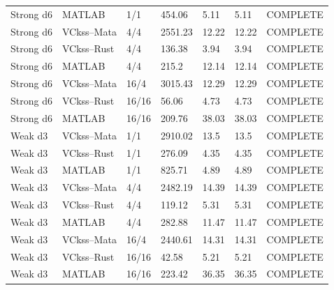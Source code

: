 \begin{longtable}{lllllll}
Strong d6 & MATLAB & 1/1 & 454.06 & 5.11 & 5.11 & COMPLETE \\
Strong d6 & VCkss--Mata & 4/4 & 2551.23 & 12.22 & 12.22 & COMPLETE \\
Strong d6 & VCkss--Rust & 4/4 & 136.38 & 3.94 & 3.94 & COMPLETE \\
Strong d6 & MATLAB & 4/4 & 215.2 & 12.14 & 12.14 & COMPLETE \\
Strong d6 & VCkss--Mata & 16/4 & 3015.43 & 12.29 & 12.29 & COMPLETE \\
Strong d6 & VCkss--Rust & 16/16 & 56.06 & 4.73 & 4.73 & COMPLETE \\
Strong d6 & MATLAB & 16/16 & 209.76 & 38.03 & 38.03 & COMPLETE \\
Weak d3 & VCkss--Mata & 1/1 & 2910.02 & 13.5 & 13.5 & COMPLETE \\
Weak d3 & VCkss--Rust & 1/1 & 276.09 & 4.35 & 4.35 & COMPLETE \\
Weak d3 & MATLAB & 1/1 & 825.71 & 4.89 & 4.89 & COMPLETE \\
Weak d3 & VCkss--Mata & 4/4 & 2482.19 & 14.39 & 14.39 & COMPLETE \\
Weak d3 & VCkss--Rust & 4/4 & 119.12 & 5.31 & 5.31 & COMPLETE \\
Weak d3 & MATLAB & 4/4 & 282.88 & 11.47 & 11.47 & COMPLETE \\
Weak d3 & VCkss--Mata & 16/4 & 2440.61 & 14.31 & 14.31 & COMPLETE \\
Weak d3 & VCkss--Rust & 16/16 & 42.58 & 5.21 & 5.21 & COMPLETE \\
Weak d3 & MATLAB & 16/16 & 223.42 & 36.35 & 36.35 & COMPLETE \\
\bottomrule
\end{longtable}
\endgroup

